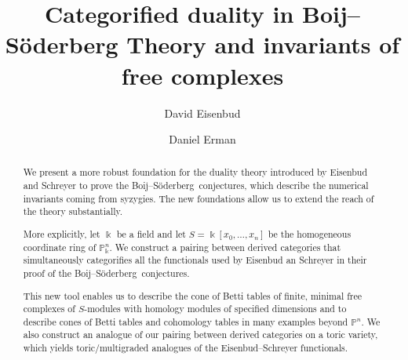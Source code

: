 \documentclass[12pt]{amsart}
\title{Categorified duality in Boij--S\"oderberg Theory and invariants of free complexes}
\author{David Eisenbud}
\author{Daniel Erman}
\theoremstyle{definition}
\theoremstyle{remark}
\newcommand{\kk}{\Bbbk}
\newcommand{\PP}{\mathbb{P}}
\def\BS{Boij--S\"oderberg~}
\begin{document}
\begin{abstract} We present a more robust foundation for the duality theory introduced by Eisenbud and Schreyer to prove the \BS conjectures, which describe the numerical invariants coming from syzygies.
The new foundations allow us to extend the reach of the theory substantially.

More explicitly, let $\kk$ be a field and let $S = \kk[x_{0}, \dots,x_{n}]$ be the homogeneous coordinate ring of $\PP^{n}_{\kk}$.
We construct a pairing between derived categories that
simultaneously categorifies all the functionals used by Eisenbud an Schreyer in their proof of the \BS conjectures.

This new tool enables us to describe the cone of Betti tables of finite, minimal free complexes of $S$-modules with homology modules of specified dimensions and  to describe cones of Betti tables and cohomology tables in many examples beyond $\PP^n$. We also construct an analogue of our pairing between derived categories on a toric variety, which yields toric/multigraded analogues of the Eisenbud--Schreyer functionals.
\end{abstract}

\maketitle

\tableofcontents


\end{document}
